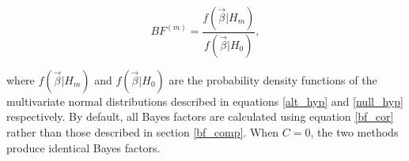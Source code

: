 \documentclass{article}
\begin{document}
\begin{equation}
\label{bf_cor}
BF^{(m)} = \frac{f(\vec{\beta}| H_m)}{f(\vec{\beta}| H_0)},
\end{equation}

\noindent where $f(\vec{\beta}| H_m)$ and $f(\vec{\beta}| H_0)$ are the probability density functions of the multivariate normal distributions described in equations \ref{alt_hyp} and \ref{null_hyp} respectively. By default, all Bayes factors are calculated using equation \ref{bf_cor} rather than those described in section \ref{bf_comp}. When $C = 0$, the two methods produce identical Bayes factors.




\end{document}
